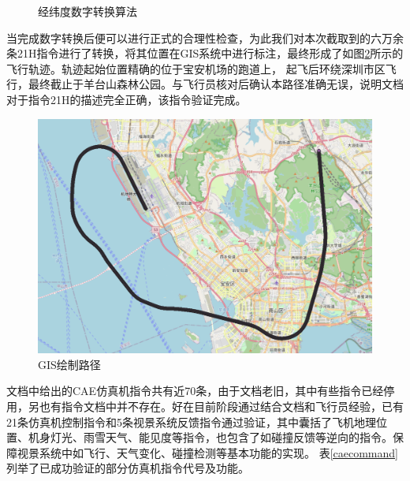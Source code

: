 \begin{figure}[h!]
    \centering
     
    \caption{经纬度数字转换算法}
    \label{llconv}
\end{figure}
\par
当完成数字转换后便可以进行正式的合理性检查，为此我们对本次截取到的六万余条21H指令进行了转换，将其位置在GIS系统中进行标注，最终形成了如图\ref{GIStrace}所示的飞行轨迹。轨迹起始位置精确的位于宝安机场的跑道上，
起飞后环绕深圳市区飞行，最终截止于羊台山森林公园。与飞行员核对后确认本路径准确无误，说明文档对于指令21H的描述完全正确，该指令验证完成。
\begin{figure}[h!]
    \begin{center}
        \includegraphics[width=.9\textwidth]{pictures/trace.png}
        \caption{GIS绘制路径}
        \label{GIStrace}
    \end{center}
\end{figure}
\par
文档中给出的CAE仿真机指令共有近70条，由于文档老旧，其中有些指令已经停用，另也有指令文档中并不存在。好在目前阶段通过结合文档和飞行员经验，已有21条仿真机控制指令和5条视景系统反馈指令通过验证，其中囊括了飞机地理位置、机身灯光、雨雪天气、能见度等指令，也包含了如碰撞反馈等逆向的指令。保障视景系统中如飞行、天气变化、碰撞检测等基本功能的实现。
表\ref{caecommand}列举了已成功验证的部分仿真机指令代号及功能。
\clearpage
